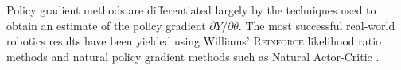 Policy gradient methods are differentiated largely by the techniques used to
obtain an estimate of the policy gradient $\partial Y / \partial \theta$.
The most successful real-world robotics results have been yielded using
Williams' \textsc{Reinforce} likelihood ratio methods \cite{williams:reinforce}
and natural policy gradient methods such as Natural Actor-Critic
\cite{peters:enac}.

%
%
%


